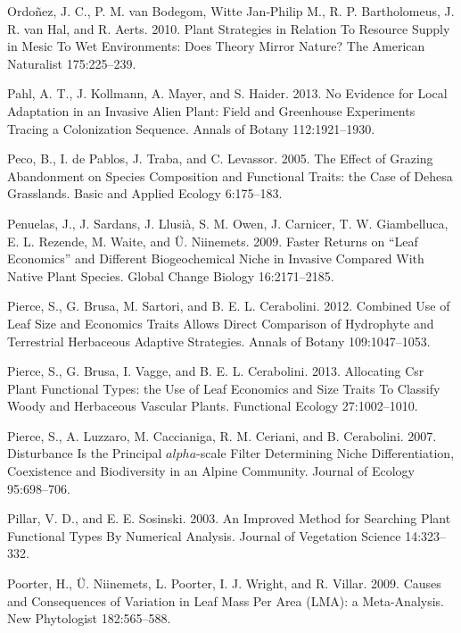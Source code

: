 \documentclass[11pt]{article}
\begin{document}
\begin{hangparas}{1.5em}{1}
\hypertarget{citeproc_bib_item_82}{Ordoñez, J. C., P. M. van Bodegom, Witte Jan‐Philip M., R. P. Bartholomeus, J. R. van Hal, and R. Aerts. 2010. Plant Strategies in Relation To Resource Supply in Mesic To Wet Environments: Does Theory Mirror Nature? The American Naturalist 175:225–239.}

\hypertarget{citeproc_bib_item_83}{Pahl, A. T., J. Kollmann, A. Mayer, and S. Haider. 2013. No Evidence for Local Adaptation in an Invasive Alien Plant: Field and Greenhouse Experiments Tracing a Colonization Sequence. Annals of Botany 112:1921–1930.}

\hypertarget{citeproc_bib_item_84}{Peco, B., I. de Pablos, J. Traba, and C. Levassor. 2005. The Effect of Grazing Abandonment on Species Composition and Functional Traits: the Case of Dehesa Grasslands. Basic and Applied Ecology 6:175–183.}

\hypertarget{citeproc_bib_item_85}{Penuelas, J., J. Sardans, J. Llusià, S. M. Owen, J. Carnicer, T. W. Giambelluca, E. L. Rezende, M. Waite, and Ü. Niinemets. 2009. Faster Returns on “Leaf Economics” and Different Biogeochemical Niche in Invasive Compared With Native Plant Species. Global Change Biology 16:2171–2185.}

\hypertarget{citeproc_bib_item_86}{Pierce, S., G. Brusa, M. Sartori, and B. E. L. Cerabolini. 2012. Combined Use of Leaf Size and Economics Traits Allows Direct Comparison of Hydrophyte and Terrestrial Herbaceous Adaptive Strategies. Annals of Botany 109:1047–1053.}

\hypertarget{citeproc_bib_item_87}{Pierce, S., G. Brusa, I. Vagge, and B. E. L. Cerabolini. 2013. Allocating Csr Plant Functional Types: the Use of Leaf Economics and Size Traits To Classify Woody and Herbaceous Vascular Plants. Functional Ecology 27:1002–1010.}

\hypertarget{citeproc_bib_item_88}{Pierce, S., A. Luzzaro, M. Caccianiga, R. M. Ceriani, and B. Cerabolini. 2007. Disturbance Is the Principal $alpha$-scale Filter Determining Niche Differentiation, Coexistence and Biodiversity in an Alpine Community. Journal of Ecology 95:698–706.}

\hypertarget{citeproc_bib_item_89}{Pillar, V. D., and E. E. Sosinski. 2003. An Improved Method for Searching Plant Functional Types By Numerical Analysis. Journal of Vegetation Science 14:323–332.}

\hypertarget{citeproc_bib_item_90}{Poorter, H., Ü. Niinemets, L. Poorter, I. J. Wright, and R. Villar. 2009. Causes and Consequences of Variation in Leaf Mass Per Area (LMA): a Meta-Analysis. New Phytologist 182:565–588.}


\end{hangparas}
\end{document}
